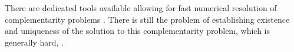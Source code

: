 There are dedicated tools available allowing for fast numerical resolution of complementarity problems \citep{acary2019introduction, dirkse1995path}. There is still the problem of establishing existence and uniqueness of the solution to this complementarity problem, which is generally hard, \citep{hadjisavvas2006handbook}.




\begin{comment}
\begin{equation}
  \begin{split}
  \nabla_{\sigma_i}U_i((\sigma_j)_{j=1}^M) \mid_{\sigma_i = \overbar{\sigma}_i}  + \mu_i - \lambda  \cdot 1_H = 0 \\
  \ip{\sigma_i}{\mu_i} = 0 \\
  \mu_i \in H_+ \\
  \sigma_i \in H_+ \\
  \int_X \sigma_i d\mu(x)- 1 = 0
\end{split}
\end{equation}
\end{comment}
\begin{comment}
The family of complementarity problems in \Cref{eq:comp_form} can be gathered into a single complementarity problem. We define $dU = \begin{pmatrix} \nabla_{\sigma_1} U_1 \mid_{\sigma_1 = \overbar{\sigma}_1}\\
    \vdots \\
    \nabla_{\sigma_N} U_N \mid_{\sigma_N = \overbar{\sigma}_N} \end{pmatrix}$, $S=(\sigma_i)_{i=1}^M$, and $\Lambda = (\lambda_i)_{i=1}^M$. Then \Cref{eq:KKT_total} can be restated as
\begin{equation}
  \label{eq:complementarity_form}
  \ip{dU(S)+\Lambda}{S} = 0 \\
  \ip{S_i-1}{1}\Lambda = 0
  -dU(S)-\Lambda \geq 0 \\
  \ip{S_i-1}{1} \in \{0 \}
  S\geq 0
  \Lambda \in \R^M
\end{equation}
which is a complementarity problem with $K = (H_+ \osum \R)^M$, $K^* = (H_+ \osum \{0\})^M$ and
\begin{equation}
  T(S,\lambda)=\begin{pmatrix} dU(S) + \Lambda \\ (\ip{\sigma_i}{1} - 1)_{i=1}^M \end{pmatrix}
\end{equation}
\end{comment}
